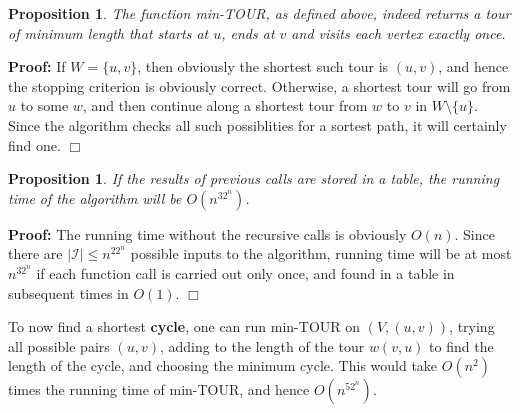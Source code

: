 \documentclass[11pt]{article} \usepackage{amssymb}
\newtheorem{proposition}[theorem]{Proposition}
\newenvironment{proof}{\noindent \textbf{Proof:}}{$\Box$}
\begin{document}
\begin{enumerate}
    \begin{proposition}
      The function min-TOUR, as defined above, indeed returns a tour of minimum
      length that starts at $u$, ends at $v$ and visits each vertex exactly
      once.
    \end{proposition}
    \begin{proof}
      If $W=\{u,v\}$, then obviously the shortest such tour is $(u,v)$, and 
      hence the stopping criterion is obviously correct. Otherwise,
      a shortest tour will go from $u$ to some $w$, and then continue along
      a shortest tour from $w$ to $v$ in $W\setminus \{u\}$. Since
      the algorithm checks all such possiblities for a sortest path,
      it will certainly find one.
    \end{proof}
    \begin{proposition}
      If the results of previous calls are stored in a table, the running
      time of the algorithm will be $O(n^32^n)$.
    \end{proposition}
    \begin{proof}
      The running time without the recursive calls is obviously
      $O(n)$. Since there are $|\mathcal{I}|\leq n^22^n$ possible inputs to 
      the algorithm,
      running time will be at most $n^32^n$ if each function call is carried
      out only once, and found in a table in subsequent times in $O(1)$.
    \end{proof}

    To now find a shortest {\bf cycle}, one can run min-TOUR on $(V,(u,v))$, 
    trying all possible pairs $(u,v)$, adding to the length of the tour
    $w(v,u)$ to find the length of the cycle, and choosing the minimum cycle.
    This would take $O(n^2)$ times the running time of min-TOUR, and hence
    $O(n^52^n)$.
\end{enumerate}
\end{document}
